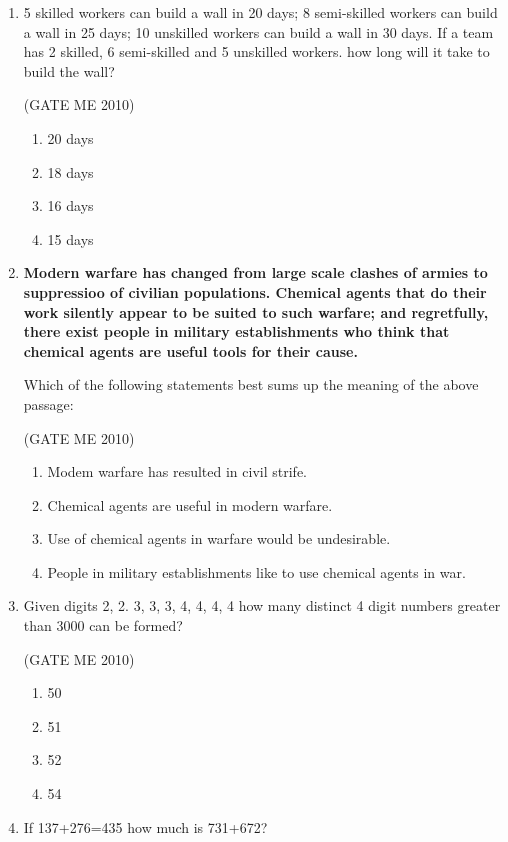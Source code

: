 \documentclass[journal,12pt,onecolumn]{IEEEtran}
\theoremstyle{remark}
\begin{document}
\begin{enumerate}
\item 5 skilled workers can build a wall in 20 days; 8 semi-skilled workers can build a wall in 25 days;
10 unskilled workers can build a wall in 30 days. If a team has 2 skilled, 6 semi-skilled and
5 unskilled workers. how long will it take to build the wall?

\hfill{(GATE  ME 2010)}\\

\begin{multicols}{4}
\begin{enumerate}

\item 20 days
\item 18 days
\item 16 days
\item 15 days
\end{enumerate}
\end{multicols}



\item \textbf{Modern warfare has changed from large scale clashes of armies to suppressioo of civilian
populations. Chemical agents that do their work silently appear to be suited to such warfare;
and regretfully, there exist people in military establishments who think that chemical agents
are useful tools for their cause.}

Which of the following statements best sums up the meaning of the above passage:

\hfill{(GATE  ME 2010)}\\

\begin{enumerate}
\item Modem warfare has resulted in civil strife.
\item  Chemical agents are useful in modern warfare.
\item  Use of chemical agents in warfare would be undesirable.
\item  People in military establishments like to use chemical agents in war.
\end{enumerate}


\item Given digits 2, 2. 3, 3, 3, 4, 4, 4, 4 how many distinct 4 digit numbers greater than 3000 can be
formed?

\hfill{(GATE  ME 2010)}\\

\begin{multicols}{4}
\begin{enumerate}
    \item 50
    \item 51
    \item 52
    \item 54
\end{enumerate}
\end{multicols}
\item If 137+276=435 how much is 731+672?


\end{enumerate}
\end{document}
